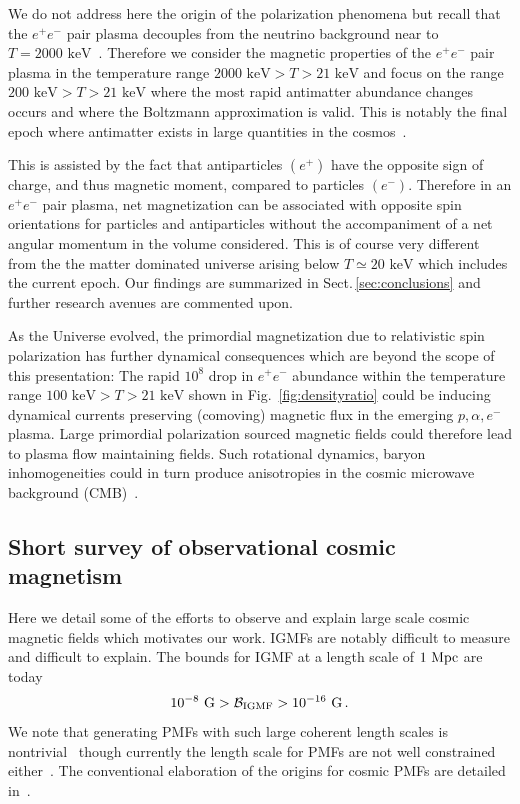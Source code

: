 \documentclass[aps,prd,floatfix,reprint]{revtex4-2}
\newcommand*{\keV}{\text{ keV}}
\newcommand{\rf}[1]{Fig.~{\ref{#1}}}
\newcommand{\rsec}[1]{Sect.\,{\ref{#1}}}
\begin{document}
We do not address here the origin of the polarization phenomena but recall that the $e^{+}e^{-}$ pair plasma decouples from the neutrino background near to $T=2000\keV$~\cite{Birrell:2014uka}. Therefore
we consider the magnetic properties of the $e^{+}e^{-}$ pair plasma in the temperature range  $2000\keV>T>21\keV$ and focus on the range $200\keV>T>21\keV$ where the most rapid antimatter abundance changes occurs and where the Boltzmann approximation is valid. This is notably the final epoch where antimatter exists in large quantities in the cosmos~\cite{Rafelski:2023emw}. 

This is assisted by the fact that antiparticles $(e^{+})$ have the opposite sign of charge, and thus magnetic moment, compared to particles $(e^{-})$. Therefore in an $e^{+}e^{-}$ pair plasma, net magnetization can be associated with opposite spin orientations for particles and antiparticles without the accompaniment of a net angular momentum in the volume considered. This is of course very different from the the matter dominated universe arising below $T\simeq20\keV$ which includes the current epoch. Our findings are summarized in \rsec{sec:conclusions} and further research avenues are commented upon.

As the Universe evolved, the primordial magnetization due to relativistic spin polarization has further dynamical consequences which are beyond the scope of this presentation: The rapid $10^{8}$ drop in $e^{+}e^{-}$ abundance within the temperature range $100\keV>T>21\keV$ shown in \rf{fig:densityratio} could be inducing dynamical currents preserving (comoving) magnetic flux in the emerging $p,\alpha,e^{-}$ plasma. Large primordial polarization sourced magnetic fields could therefore lead to plasma flow maintaining fields. Such rotational dynamics, baryon inhomogeneities could in turn produce anisotropies in the cosmic microwave background (CMB)~\cite{Jedamzik:2013gua,Abdalla:2022yfr}.

\subsection{Short survey of observational cosmic magnetism}
\label{sec:survey}
\noindent Here we detail some of the efforts to observe and explain large scale cosmic magnetic fields which motivates our work. IGMFs are notably difficult to measure and difficult to explain. The bounds for IGMF at a length scale of $1{\rm\ Mpc}$ are today~\cite{Neronov:2010gir,Taylor:2011bn,Pshirkov:2015tua,Jedamzik:2018itu,Vernstrom:2021hru}
\begin{align}
 \label{igmf}
 10^{-8}{\rm\ G}>\mathcal{B}_{\rm IGMF}>10^{-16}{\rm\ G}\,.
\end{align}
We note that generating PMFs with such large coherent length scales is nontrivial~\cite{Giovannini:2022rrl} though currently the length scale for PMFs are not well constrained either~\cite{AlvesBatista:2021sln}. The conventional elaboration of the origins for cosmic PMFs are detailed in~\cite{Gaensler:2004gk,Durrer:2013pga,AlvesBatista:2021sln}.
\end{document}
